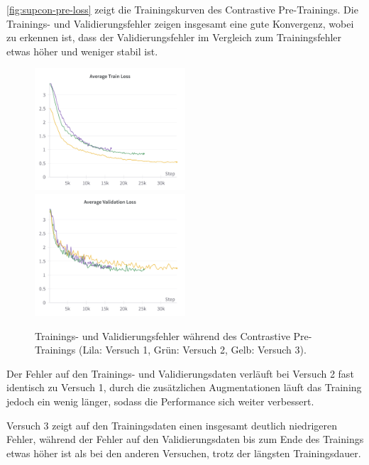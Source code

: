\autoref{fig:supcon-pre-loss} zeigt die Trainingskurven des Contrastive Pre-Trainings. Die Trainings- und Validierungsfehler zeigen insgesamt eine gute Konvergenz, wobei zu erkennen ist, dass der Validierungsfehler im Vergleich zum Trainingsfehler etwas höher und weniger stabil ist.

\begin{figure}[h]
	\centering
	\includegraphics[width=0.5\textwidth]{figure_results_supcon-pre_avg-train-loss.png}%
	\includegraphics[width=0.5\textwidth]{figure_results_supcon-pre_avg-val-loss.png}
	\caption[Trainings- und Validierungsfehler während des Contrastive Pre-Trainings.]{Trainings- und Validierungsfehler während des Contrastive Pre-Trainings (\textcolor{exp1}{Lila}: Versuch 1, \textcolor{exp2}{Grün}: Versuch 2, \textcolor{exp3}{Gelb}: Versuch 3).}
	\label{fig:supcon-pre-loss}
\end{figure}

Der Fehler auf den Trainings- und Validierungsdaten verläuft bei Versuch 2 fast identisch zu Versuch 1, durch die zusätzlichen Augmentationen läuft das Training jedoch ein wenig länger, sodass die Performance sich weiter verbessert.

Versuch 3 zeigt auf den Trainingsdaten einen insgesamt deutlich niedrigeren Fehler, während der Fehler auf den Validierungsdaten bis zum Ende des Trainings etwas höher ist als bei den anderen Versuchen, trotz der längsten Trainingsdauer.

